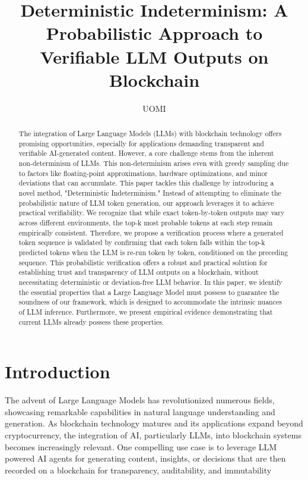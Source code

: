 \documentclass{article}
\title{Deterministic Indeterminism: A Probabilistic Approach to Verifiable LLM Outputs on Blockchain}
\author{UOMI}
\begin{document}
\maketitle

\begin{abstract}
The integration of Large Language Models (LLMs) with blockchain technology offers promising opportunities, especially for applications demanding transparent and verifiable AI-generated content. However, a core challenge stems from the inherent non-determinism of LLMs. This non-determinism arises even with greedy sampling due to factors like floating-point approximations, hardware optimizations, and minor deviations that can accumulate. This paper tackles this challenge by introducing a novel method, "Deterministic Indeterminism."  Instead of attempting to eliminate the probabilistic nature of LLM token generation, our approach leverages it to achieve practical verifiability. We recognize that while exact token-by-token outputs may vary across different environments, the top-k most probable tokens at each step remain empirically consistent.  Therefore, we propose a verification process where a generated token sequence is validated by confirming that each token falls within the top-k predicted tokens when the LLM is re-run token by token, conditioned on the preceding sequence. This probabilistic verification offers a robust and practical solution for establishing trust and transparency of LLM outputs on a blockchain, without necessitating deterministic or deviation-free LLM behavior. In this paper, we identify the essential properties that a Large Language Model must possess to guarantee the soundness of our framework, which is designed to accommodate the intrinsic nuances of LLM inference. Furthermore, we present empirical evidence demonstrating that current LLMs already possess these properties.
\end{abstract}


\section{Introduction}

The advent of Large Language Models has revolutionized numerous fields, showcasing remarkable capabilities in natural language understanding and generation. As blockchain technology matures and its applications expand beyond cryptocurrency, the integration of AI, particularly LLMs, into blockchain systems becomes increasingly relevant. One compelling use case is to leverage LLM powered AI agents for generating content, insights, or decisions that are then recorded on a blockchain for transparency, auditability, and immutability
\end{document}
